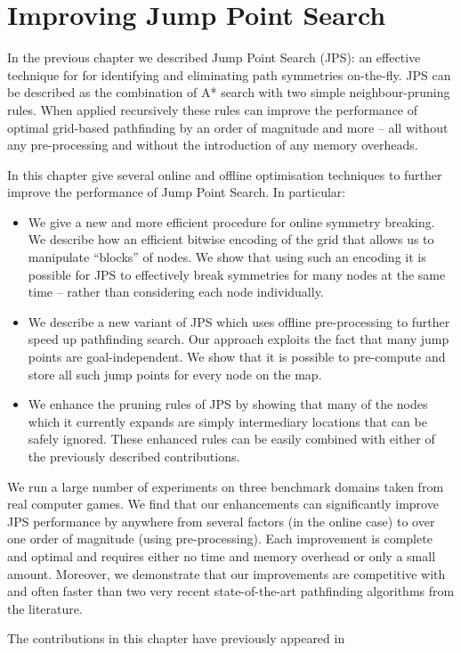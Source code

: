 \chapter{Improving Jump Point Search}
\label{cha::jps2}
In the previous chapter we described Jump Point Search (JPS): an effective
technique for for identifying and eliminating path symmetries on-the-fly.  JPS
can be described as the combination of A* search with two simple
neighbour-pruning rules. When applied recursively these rules can improve the
performance of optimal grid-based pathfinding by an order of magnitude and
more -- all without any pre-processing and without the introduction of any
memory overheads. 

In this chapter give several online and offline optimisation techniques to 
further improve the performance of Jump Point Search. In particular:
\begin{itemize}
\item We give a new and more efficient procedure for online symmetry breaking. 
We describe how an efficient bitwise encoding of the grid that
allows us to manipulate ``blocks'' of nodes.
We show that using such an encoding it is possible
for JPS to effectively break symmetries for many nodes at the same time -- 
rather than considering each node individually.
\item We describe a new variant of JPS which uses offline pre-processing to 
further speed up pathfinding search. Our approach exploits the fact that many
jump points are goal-independent. We show that it is possible to pre-compute 
and store all such jump points for every node on the map.
\item We enhance the pruning rules of JPS by showing that many of the nodes
which it currently expands are simply intermediary locations that can be
safely ignored. These enhanced rules can be easily combined with either
of the previously described contributions.
\end{itemize}

We run a large number of experiments on three benchmark domains taken from real
computer games. We find that our  enhancements can significantly improve JPS performance by
anywhere from several factors  (in the online case) to over one order of magnitude
(using pre-processing). Each improvement is complete and optimal
and requires either no time and memory overhead or only a small amount.
Moreover, we demonstrate that our improvements are competitive with and often 
faster than two very recent state-of-the-art pathfinding algorithms from the literature.

The contributions in this chapter have previously appeared in~
\citep{DBLP:conf/aips/HaraborG14}

